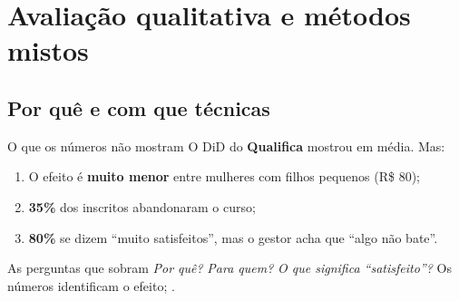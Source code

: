 \section[Qualitativo]{Avaliação qualitativa e métodos mistos}
\subsection{Por quê e com que técnicas}

\begin{frame}{O que os números não mostram}
  O DiD do \textbf{Qualifica} mostrou  em média. Mas:
  \vspace{0.2cm}
  \begin{enumerate}
    \item O efeito é \textbf{muito menor} entre mulheres com filhos pequenos (R\$ 80);
    \item \textbf{35\%} dos inscritos abandonaram o curso;
    \item \textbf{80\%} se dizem ``muito satisfeitos'', mas o gestor acha que ``algo não bate''.
  \end{enumerate}
  \vspace{0.3cm}
  \begin{block}{As perguntas que sobram}
    \small \emph{Por quê?} \emph{Para quem?} \emph{O que significa ``satisfeito''?} Os números identificam o efeito; .
  \end{block}
\end{frame}

